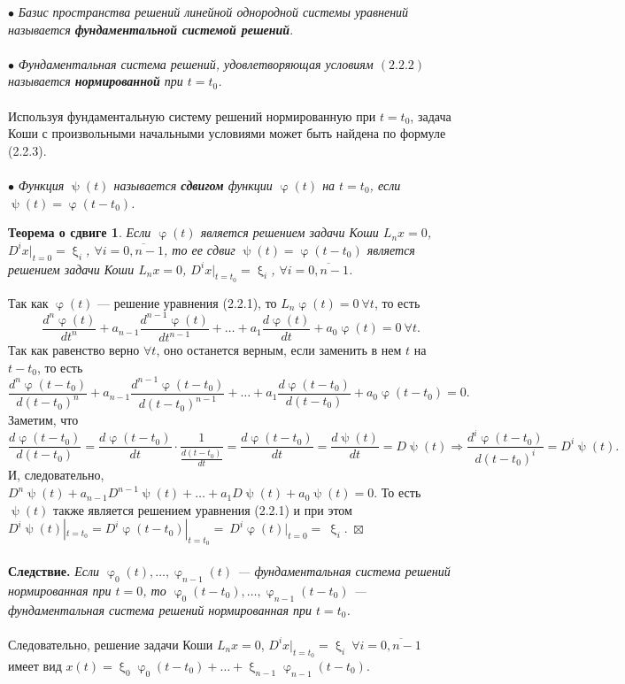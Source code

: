 \documentclass[a4paper, 12pt]{report}
\newenvironment{Proof} %
{\par\noindent{$\blacklozenge$}} %
{\hfill$\scriptstyle\boxtimes$}
\renewcommand{\varphi}{\upvarphi}
\renewcommand{\psi}{\uppsi}
\renewcommand{\xi}{\upxi}
\begin{document}
	$\bullet$ \textit{Базис пространства решений линейной однородной системы уравнений называется \textbf{фундаментальной системой решений}}.\\\\
	$\bullet$ \textit{Фундаментальная система решений, удовлетворяющая условиям $(2.2.2)$ называется \textbf{нормированной} при $t = t_0$.}\\\\
	Используя фундаментальную систему решений нормированную при $t=t_0$, задача Коши с произвольными начальными условиями может быть найдена по формуле (2.2.3).\\\\
	$\bullet$ \textit{Функция $\psi(t)$ называется \textbf{сдвигом} функции $\varphi(t)$ на $t=t_0$, если $\psi(t) = \varphi(t-t_0)$.}
	\newtheorem*{2_2_4}{Теорема о сдвиге}\begin{2_2_4}
		Если $\varphi(t)$ является решением задачи Коши $L_nx = 0$, $D^ix|_{t=0} = \xi_i$, $\forall i = \overline{0,n-1}$, то ее сдвиг $\psi(t) = \varphi(t-t_0)$ является решением задачи Коши  $L_nx = 0$, $D^ix|_{t=t_0} = \xi_i$, $\forall i = \overline{0,n-1}$.
	\end{2_2_4}\begin{Proof}
		Так как $\varphi(t)$ --- решение уравнения (2.2.1), то $L_n\varphi(t) = 0\ \forall t$, то есть $$\dfrac{d^n\varphi(t)}{dt^n}+a_{n-1}\dfrac{d^{n-1}\varphi(t)}{dt^{n-1}} + \ldots + a_1\dfrac{d\varphi(t)}{dt} + a_0 \varphi(t) = 0\ \forall t.$$
		Так как равенство верно $\forall t$, оно останется верным, если заменить в нем $t$ на $t-t_0$, то есть
		$$\dfrac{d^n\varphi(t-t_0)}{d(t-t_0)^n}+a_{n-1}\dfrac{d^{n-1}\varphi(t-t_0)}{d(t-t_0)^{n-1}} + \ldots + a_1\dfrac{d\varphi(t-t_0)}{d(t-t_0)} + a_0 \varphi(t-t_0) = 0.$$ Заметим, что $$\dfrac{d\varphi(t-t_0)}{d(t-t_0)} = \dfrac{d\varphi(t-t_0)}{dt} \cdot \dfrac{1}{\frac{d(t-t_0)}{dt}} = \dfrac{d\varphi(t-t_0)}{dt} = \dfrac{d\psi(t)}{dt} = D\psi(t)\Rightarrow\dfrac{d^i\varphi(t-t_0)}{d(t-t_0)^i} = D^i\psi(t).$$ И, следовательно, $D^n\psi(t) + a_{n-1}D^{n-1}\psi(t) + \ldots + a_1D\psi(t) + a_0\psi(t) = 0$. То есть $\psi(t)$ также является решением уравнения (2.2.1) и при этом $D^i\psi(t)|_{t=t_0} = D^i\varphi(t-t_0)|_{t=t_0} =~D^i\varphi(t)|_{t=0} =~\xi_i.$~\end{Proof}\\\\
	\textbf{Следствие.} \textit{Если $\varphi_0(t),\ldots,\varphi_{n-1}(t)$ --- фундаментальная система решений нормированная при $t=0$, то $\varphi_0(t-t_0),\ldots,\varphi_{n-1}(t-t_0)$ --- фундаментальная система решений нормированная при $t=t_0$.}\\\\
	Следовательно, решение задачи Коши $L_nx = 0$, $D^ix|_{t=t_0} = \xi_i\ \forall i = \overline{0,n-1}$ имеет вид $x(t) = \xi_0\varphi_0(t-t_0) + \ldots + \xi_{n-1}\varphi_{n-1}(t-t_0)$.
\end{document}
